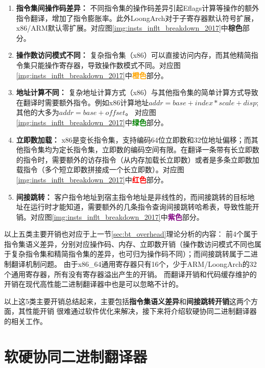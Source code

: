 \begin{enumerate}
  \item \textbf{指令集间操作码差异：} 不同指令集的操作码差异引起Eflags计算等操作的额外指令翻译，增加了指令膨胀率。此外LoongArch对于子寄存器默认符号扩展，x86/ARM默认零扩展。对应图\ref{img:insts_inflt_breakdown_2017}中\textcolor{Sepia}{\textbf{棕色}}部分。
  
  \item \textbf{操作数访问模式不同：} 复杂指令集（x86）可以直接访问内存，而其他精简指令集只能操作寄存器，导致操作数模式不同。对应图\ref{img:insts_inflt_breakdown_2017}中\textcolor{orange}{\textbf{橙色}}部分。
  
  \item \textbf{地址计算不同：} 复杂地址计算方式（x86）与其他指令集的简单计算方式导致在翻译时需要额外指令。例如x86计算地址$addr = base + index * scale +disp$; 其他的大多为$addr = base + offset$。 对应图\ref{img:insts_inflt_breakdown_2017}中\textcolor{green}{\textbf{绿色}}部分。
  
  \item \textbf{立即数加载：} x86是变长指令集，支持编码64位立即数和32位地址偏移；而其他指令集均为定长指令集，立即数的编码空间有限。在翻译一条带有长立即数的指令时，需要额外的访存指令（从内存加载长立即数）或者是多条立即数加载指令（多个短立即数拼接成一个长立即数）。对应图\ref{img:insts_inflt_breakdown_2017}中\textcolor{red}{\textbf{红色}}部分。
  
  \item \textbf{间接跳转：} 客户指令地址到宿主指令地址是非线性的，而间接跳转的目标地址在运行时才能知道，需要额外的几条指令查询间接跳转哈希表，导致性能开销。对应图\ref{img:insts_inflt_breakdown_2017}中\textcolor{Purple}{\textbf{紫色}}部分。
  
\end{enumerate}

以上五类主要开销也对应于上一节\ref{sec:bt_overhead}理论分析的内容：
前4个属于指令集语义差异，分别对应操作码、内存、立即数开销（操作数访问模式不同也属于复杂指令集和精简指令集的差异，也可归为操作码不同）；而间接跳转属于二进制翻译机制问题。
由于x86\_64通用寄存器只有16个，少于ARM/LoongArch的32个通用寄存器，所有没有寄存器溢出产生的开销。
而翻译开销和代码缓存维护的开销在现代高性能二进制翻译器中也是可以忽略不计的。

以上这5类主要开销总结起来，主要包括\textbf{指令集语义差异}和\textbf{间接跳转开销}这两个方面，其性能开销
很难通过软件优化来解决，接下来将介绍软硬协同二进制翻译器的相关工作。

\section{软硬协同二进制翻译器}

